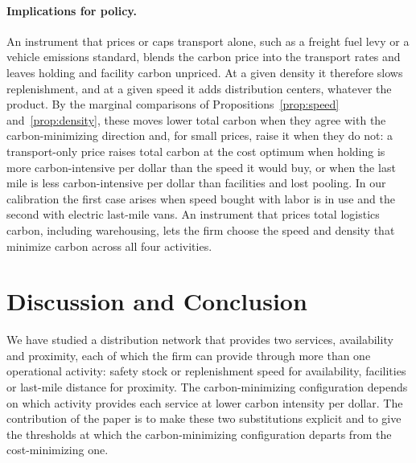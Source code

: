 \documentclass[11pt]{article}
\theoremstyle{definition}
\theoremstyle{remark}
\theoremstyle{plain}
\begin{document}
\paragraph{Implications for policy.} An instrument that prices or caps transport alone, such as a freight fuel
levy or a vehicle emissions standard, blends the carbon price into the transport rates and leaves holding and
facility carbon unpriced. At a given density it therefore slows replenishment, and at a given speed it adds
distribution centers, whatever the product. By the marginal comparisons of Propositions~\ref{prop:speed}
and~\ref{prop:density}, these moves lower total carbon when they agree with the carbon-minimizing direction and,
for small prices, raise it when they do not: a transport-only price raises total carbon at the cost optimum when
holding is more carbon-intensive per dollar than the speed it would buy, or when the last mile is less
carbon-intensive per dollar than facilities and lost pooling. In our calibration the first case arises when speed
bought with labor is in use and the second with electric last-mile vans. An instrument that prices total
logistics carbon, including warehousing, lets the firm choose the speed and density that minimize carbon across
all four activities.

\section{Discussion and Conclusion}\label{sec:discussion}

We have studied a distribution network that provides two services, availability and proximity, each of
which the firm can provide through more than one operational activity: safety stock or replenishment speed
for availability, facilities or last-mile distance for proximity. The carbon-minimizing configuration
depends on which activity provides each service at lower carbon intensity per dollar. The contribution of
the paper is to make these two substitutions explicit and to give the thresholds at which the
carbon-minimizing configuration departs from the cost-minimizing one.
\end{document}
